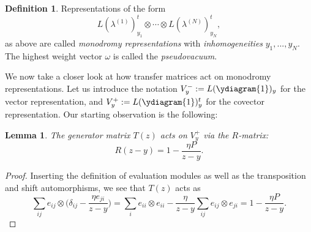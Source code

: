 \documentclass[11pt]{report}
\newtheorem{lemma}[theorem]{Lemma}
\theoremstyle{definition}
\newtheorem{definition}[theorem]{Definition}
\theoremstyle{remark}
\theoremstyle{remark}
\begin{document}
\begin{definition}
Representations of the form
\begin{equation*}
L(\lambda^{(1)})_{y_1}^t \otimes \cdots \otimes L(\lambda^{(N)})_{y_N}^t,
\end{equation*}
as above are called \emph{monodromy representations} with \emph{inhomogeneities} $y_1,...,y_N$. The highest weight vector $\omega$ is called the \emph{pseudovacuum}.
\end{definition}

We now take a closer look at how transfer matrices act on monodromy representations. Let us introduce the notation $V_y^- := L(\ydiagram{1})_y$ for the vector representation, and $V_y^+ := L(\ydiagram{1})_y^t$ for the covector representation. Our starting observation is the following:

\begin{lemma}
The generator matrix $T(z)$ acts on $V_y^+$ via the $R$-matrix:
\begin{equation*}
R(z-y) = 1 - \frac{\eta P}{z-y}.
\end{equation*}
\end{lemma}

\begin{proof}
Inserting the definition of evaluation modules as well as the transposition and shift automorphisms, we see that $T(z)$ acts as
\begin{equation*}
\sum_{ij} e_{ij} \otimes \bigg( \delta_{ij} - \frac{\eta e_{ji}}{z-y} \bigg)
= \sum_{i} e_{ii} \otimes e_{ii} - \frac{\eta}{z-y} \sum_{ij} e_{ij} \otimes e_{ji} = 1 - \frac{\eta P}{z-y}.
\end{equation*}
\end{proof}
\end{document}
